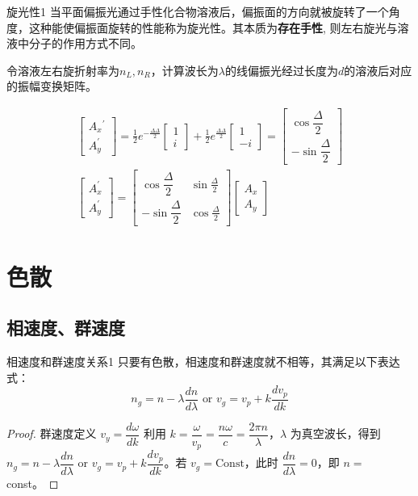 \begin{mydef}{旋光性}{1}
	当平面偏振光通过手性化合物溶液后，偏振面的方向就被旋转了一个角度，这种能使偏振面旋转的性能称为旋光性。其本质为\textbf{存在手性}, 则左右旋光与溶液中分子的作用方式不同。
\end{mydef}
\begin{example}
	令溶液左右旋折射率为$n_{L},n_{R}$，计算波长为$\lambda$的线偏振光经过长度为$d$的溶液后对应的振幅变换矩阵。
	\soln

	\[
	\begin{gathered}
		{\left[\begin{array}{c}
		A_x{ }^{\prime} \\
		A_y^{\prime}
		\end{array}\right]=\frac{1}{2} e^{-\frac{\Delta \Delta}{2}}\left[\begin{array}{l}
		1 \\
		i
		\end{array}\right]+\frac{1}{2} e^{\frac{\Delta \Delta}{2}}\left[\begin{array}{c}
		1 \\
		-i
		\end{array}\right]=\left[\begin{array}{c}
		\cos \dfrac{\Delta}{2} \\
		-\sin \dfrac{\Delta}{2}
		\end{array}\right]} \\
		\left[\begin{array}{l}
			A_x^{\prime} \\
			A_y^{\prime}
			\end{array}\right]=\left[\begin{array}{cc}
			\cos \dfrac{\Delta}{2} & \sin \frac{\Delta}{2} \\
			-\sin \dfrac{\Delta}{2} & \cos \frac{\Delta}{2}
			\end{array}\right]\left[\begin{array}{l}
			A_x \\
			A_y
		\end{array}\right]
	\end{gathered}
	\]
\end{example}

\section{色散}
\subsection{相速度、群速度}
\begin{myprop}{相速度和群速度关系}{1}
	只要有色散，相速度和群速度就不相等，其满足以下表达式：
	\[
		n_g=n-\lambda \frac{d n}{d \lambda} \text{ or } v_g=v_p+k \frac{d v_p}{d k}
	\]
\end{myprop}
\begin{proof}
	群速度定义 $v_y=\dfrac{d \omega}{d k}$
利用 $k=\dfrac{\omega}{v_p}=\dfrac{n \omega}{c}=\dfrac{2 \pi n}{\lambda}$，$\lambda$ 为真空波长，得到 $n_g=n-\lambda \dfrac{d n}{d \lambda}$ or $v_g=v_p+k \dfrac{d v_p}{d k}$。若 $v_g= \text{Const}$，此时 $\dfrac{d n}{d \lambda}=0$，即 $n=$ const。
\end{proof}


